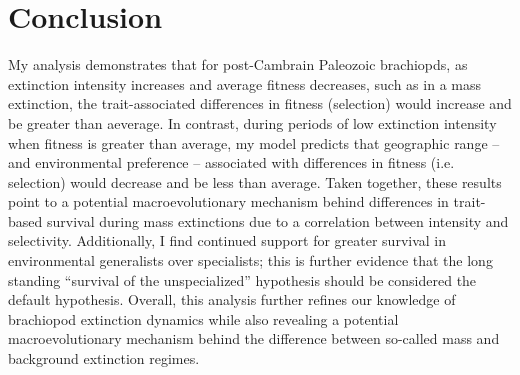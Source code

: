 \documentclass[11pt]{article}
\begin{document}
\section*{Conclusion}

My analysis demonstrates that for post-Cambrain Paleozoic brachiopds, as extinction intensity increases and average fitness decreases, such as in a mass extinction, the trait-associated differences in fitness (selection) would increase and be greater than aeverage. In contrast, during periods of low extinction intensity when fitness is greater than average, my model predicts that geographic range -- and environmental preference -- associated with differences in fitness (i.e. selection) would decrease and be less than average. Taken together, these results point to a potential macroevolutionary mechanism behind differences in trait-based survival during mass extinctions due to a correlation between intensity and selectivity. Additionally, I find continued support for greater survival in environmental generalists over specialists; this is further evidence that the long standing ``survival of the unspecialized'' hypothesis \citep{Liow2004a,Liow2007b,Simpson1944,Simpson1953,Smits2015,Nurnberg2015,Nurnberg2013a, Baumiller1993} should be considered the default hypothesis. Overall, this analysis further refines our knowledge of brachiopod extinction dynamics while also revealing a potential macroevolutionary mechanism behind the difference between so-called mass and background extinction regimes.






\end{document}
